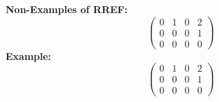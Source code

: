 \documentclass[12pt]{article}
\theoremstyle{plain}
\begin{document}
{\color{Brown}
\textbf{Non-Examples of RREF: }
\[
	\begin{pmatrix}
		0 & 1 & 0 & 2	\\
		0 & 0 & 0 & 1	\\
		0 & 0 & 0 & 0
	\end{pmatrix}
\]
\textbf{Example: }
\[
	\begin{pmatrix}
		0 & 1 & 0 & 2	\\
		0 & 0 & 0 & 1	\\
		0 & 0 & 0 & 0
	\end{pmatrix}
\]


}






\newpage
\end{document}
